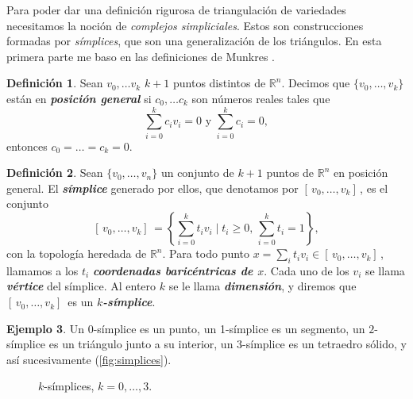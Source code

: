 \documentclass[10pt]{report}
\newcommand{\R}{\mathbb{R}}
\newcommand{\enfatiza}[1]{\textbf{\textit{#1}}}
\theoremstyle{definition}
\newtheorem{defin}{Definición}[section]
\newtheorem{eje}[defin]{Ejemplo}
\begin{document}
Para poder dar una definición rigurosa de triangulación de variedades necesitamos la noción de \textit{complejos simpliciales}. Estos son construcciones formadas por \textit{símplices}, que son una generalización de los triángulos. En esta primera parte me baso en las definiciones de Munkres \cite{munkres}.

\begin{defin}%
Sean $v_0,\dots v_k$ $k+1$ puntos distintos de $\R^n$. Decimos que $\{ v_0,\dots ,v_k\}$ están en \enfatiza{posición general} si $c_0,\dots c_k$ son números reales tales que  $$\sum_{i=0}^{k}c_iv_i=0 \text{ y } \sum_{i=0}^kc_i=0,$$ entonces $c_0=\dots =c_k=0$.
\end{defin}


\begin{defin}%
Sean $\{ v_0,\dots ,v_n\}$ un conjunto de $k+1$ puntos de $\R^n$ en posición general. El \enfatiza{símplice} generado por ellos, que denotamos por $[ \, v_0,\dots ,v_k ] \,$, es el conjunto $$[ \, v_0,\dots ,v_k] \, =\left\{  \sum_{i=0}^{k}t_iv_i \mid t_i\geq 0,\, \sum_{i=0}^{k}t_i=1 \right\}, $$ con la topología heredada de $\R^n$. Para todo punto $x=\sum_it_iv_i\in [ \, v_0,\dots ,v_k] \,$, llamamos a los $t_i$ \enfatiza{coordenadas baricéntricas de $x$}. Cada uno de los $v_i$ se llama \enfatiza{vértice} del símplice. Al entero $k$ se le llama \enfatiza{dimensión}, y diremos que $[ \, v_0,\dots ,v_k] \,$ es un \enfatiza{$k$-símplice}. 
\end{defin}

\begin{eje}
Un $0$-símplice es un punto, un 1-símplice es un segmento, un $2$-símplice es un triángulo junto a su interior, un $3$-símplice es un tetraedro sólido, y así sucesivamente (\autoref{fig:simplices}).
\end{eje}

\begin{figure}
\centering
{}
\caption{$k$-símplices, $k=0,\dots ,3$.\label{fig:simplices}}
\end{figure}
\end{document}
